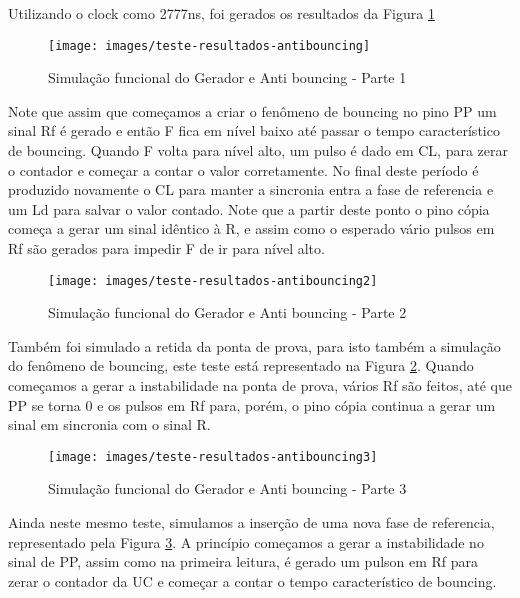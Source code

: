 \documentclass[12pt,a4paper,openany]{abntex2}
\begin{document}
Utilizando o clock como 2777ns, foi gerados os resultados da Figura \ref{fig:teste-resultados-antibouncing}

\begin{figure}[!htp]
	\centering
	\caption{Simulação funcional do Gerador e Anti bouncing - Parte 1}
	\texttt{[image: images/teste-resultados-antibouncing]}	\label{fig:teste-resultados-antibouncing}
\end{figure}

Note que assim que começamos a criar o fenômeno de bouncing no pino PP um sinal Rf é gerado e então F fica em nível baixo até passar o tempo característico de bouncing. Quando F volta para nível alto, um pulso é dado em CL, para zerar o contador e começar a contar o valor corretamente. No final deste período é produzido novamente o CL para manter a sincronia entra a fase de referencia e um Ld para salvar o valor contado. Note que a partir deste ponto o pino cópia começa a gerar um sinal idêntico à R, e assim como o esperado vário pulsos em Rf são gerados para impedir F de ir para nível alto.

\begin{figure}[!htp]
	\centering
	\caption{Simulação funcional do Gerador e Anti bouncing - Parte 2}
	\texttt{[image: images/teste-resultados-antibouncing2]}	\label{fig:teste-resultados-antibouncing2}
\end{figure}

Também foi simulado a retida da ponta de prova, para isto também a simulação do fenômeno de bouncing, este teste está representado na Figura \ref{fig:teste-resultados-antibouncing2}. Quando começamos a gerar a instabilidade na ponta de prova, vários Rf são feitos, até que PP se torna 0 e os pulsos em Rf para, porém, o pino cópia continua a gerar um sinal em sincronia com o sinal R.

\begin{figure}[!htp]
	\centering
	\caption{Simulação funcional do Gerador e Anti bouncing - Parte 3}
	\texttt{[image: images/teste-resultados-antibouncing3]}	\label{fig:teste-resultados-antibouncing3}
\end{figure}

Ainda neste mesmo teste, simulamos a inserção de uma nova fase de referencia, representado pela Figura \ref{fig:teste-resultados-antibouncing3}. A princípio começamos a gerar a instabilidade no sinal de PP, assim como na primeira leitura, é gerado um pulson em Rf para zerar o contador da UC e começar a contar o tempo característico de bouncing. 
\end{document}
